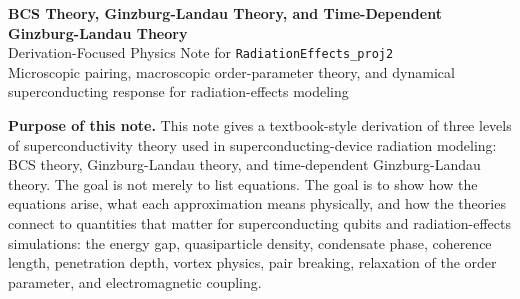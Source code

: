 \documentclass[11pt]{article}
\numberwithin{equation}{section}
\newcommand{\DocTitle}[3]{%
\begin{center}
{\LARGE \bfseries \color{TitleBlue} #1}\\[0.5em]
{\large \color{AccentTeal} #2}\\[0.8em]
{\normalsize #3}
\end{center}
\vspace{0.5em}}
\newcommand{\ProjectTOC}{\vspace{0.6em} {\hypersetup{linkcolor=TitleBlue,urlcolor=TitleBlue,citecolor=TitleBlue}\tableofcontents} \vspace{1.0em}}
\begin{document}
\DocTitle{BCS Theory, Ginzburg-Landau Theory, and Time-Dependent Ginzburg-Landau Theory}{Derivation-Focused Physics Note for \texttt{RadiationEffects\_proj2}}{Microscopic pairing, macroscopic order-parameter theory, and dynamical superconducting response for radiation-effects modeling}

\begin{overviewbox}
\textbf{Purpose of this note.} This note gives a textbook-style derivation of three levels of superconductivity theory used in superconducting-device radiation modeling: BCS theory, Ginzburg-Landau theory, and time-dependent Ginzburg-Landau theory. The goal is not merely to list equations. The goal is to show how the equations arise, what each approximation means physically, and how the theories connect to quantities that matter for superconducting qubits and radiation-effects simulations: the energy gap, quasiparticle density, condensate phase, coherence length, penetration depth, vortex physics, pair breaking, relaxation of the order parameter, and electromagnetic coupling.
\end{overviewbox}

\ProjectTOC
\end{document}
